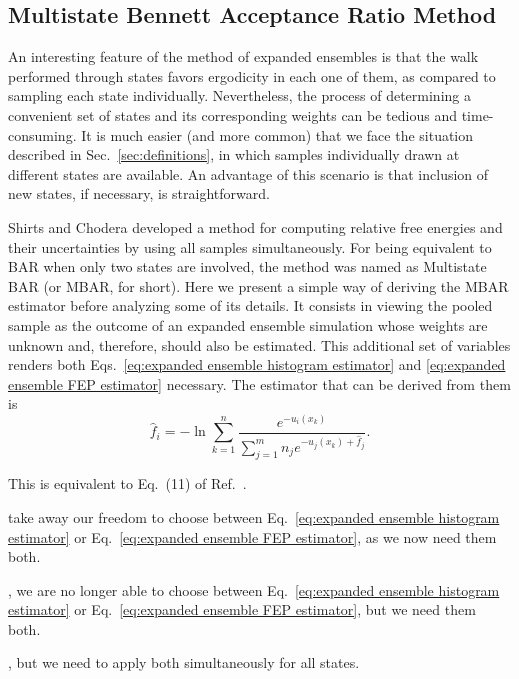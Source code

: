 \documentclass[aip,jcp,reprint,amsmath,amssymb]{revtex4-1}
\begin{document}
\subsection{Multistate Bennett Acceptance Ratio Method}

An interesting feature of the method of expanded ensembles is that the walk performed through states favors ergodicity in each one of them, as compared to sampling each state individually. Nevertheless, the process of determining a convenient set of states and its corresponding weights can be tedious and time-consuming. It is much easier (and more common) that we face the situation described in Sec.~\ref{sec:definitions}, in which samples individually drawn at different states are available. An advantage of this scenario is that inclusion of new states, if necessary, is straightforward.

Shirts and Chodera\cite{Shirts_2008} developed a method for computing relative free energies and their uncertainties by using all samples simultaneously. For being equivalent to BAR when only two states are involved, the method was named as Multistate BAR (or MBAR, for short). Here we present a simple way of deriving the MBAR estimator before analyzing some of its details. It consists in viewing the pooled sample as the outcome of an expanded ensemble simulation whose weights are unknown and, therefore, should also be estimated. This additional set of variables renders both Eqs.~\eqref{eq:expanded ensemble histogram estimator} and \eqref{eq:expanded ensemble FEP estimator} necessary. The estimator that can be derived from them is
\begin{equation}
\label{eq:mbar estimator}
\hat f_i = -\ln \sum_{k=1}^n \frac{e^{-u_i(x_k)}}{\sum_{j=1}^m n_j e^{-u_j(x_k) + \hat f_j}}.
\end{equation}

This is equivalent to Eq.~(11) of Ref.~.

take away our freedom to choose between Eq.~\eqref{eq:expanded ensemble histogram estimator} or Eq.~\eqref{eq:expanded ensemble FEP estimator}, as we now need them both.




, we are no longer able to choose between Eq.~\eqref{eq:expanded ensemble histogram estimator} or Eq.~\eqref{eq:expanded ensemble FEP estimator}, but we need them both.




, but we need to apply both simultaneously for all states. 
\end{document}
